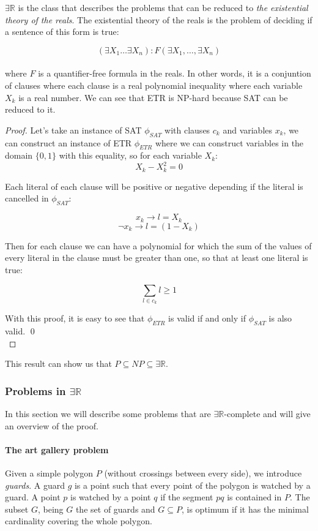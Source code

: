 $\exists \mathbb{R}$ is the class that describes the problems that can be reduced to
\textit{the existential theory of the reals}\cite{ExistentialTheoryReals2006}. The
existential theory of the reals is the problem of deciding if a sentence of this form
is true:

$$(\exists X_1 \dots \exists X_n): F(\exists X_1, \dots,\exists X_n)$$\\

where $F$ is a quantifier-free formula in the reals. In other words, it is a
conjuntion of clauses where each clause is a real polynomial inequality where
each variable $X_k$ is a real number. We can see that ETR is NP-hard because
SAT can be reduced to it.


\begin{proof}
  Let's take an instance of SAT $\phi_{SAT}$ with clauses $c_k$ and variables
  $x_k$, we can construct an instance of ETR $\phi_{ETR}$ where we can
  construct variables in the domain $\{0,1\}$ with this equality, so for each
  variable $X_k$:
  $$X_k - X_k^2 = 0$$

  Each literal of each clause will be positive or negative depending if the literal is cancelled in $\phi_{SAT}$:

  $$x_k \to l = X_k$$
  $$\neg x_k \to l = (1-X_k)$$

  Then for each clause we can have a polynomial for which the sum of the values of every
  literal in the clause must be greater than one, so that at least one literal is true:

  $$\sum_{l\in c_k} l \geq 1$$

  With this proof, it is easy to see that $\phi_{ETR}$ is valid if and only if $\phi_{SAT}$ is also valid.  \qed\\

\end{proof}

This result can show us that $P \subseteq NP \subseteq \exists \mathbb{R}$.

\subsubsection{Problems in $\exists \mathbb{R}$}

In this section we will describe some problems that are $\exists
\mathbb{R}$-complete and will give an overview of the proof.

\paragraph{The art gallery problem} Given a simple polygon $P$ (without
crossings between every side), we introduce \textit{guards}. A guard
$g$ is a point such that every point of the polygon is watched by a guard.
A point $p$ is watched by a point $q$ if the segment $pq$ is contained
in $P$. The subset $G$, being $G$ the set of guards and $G \subseteq
P$, is optimum if it has the minimal cardinality covering the whole
polygon.

